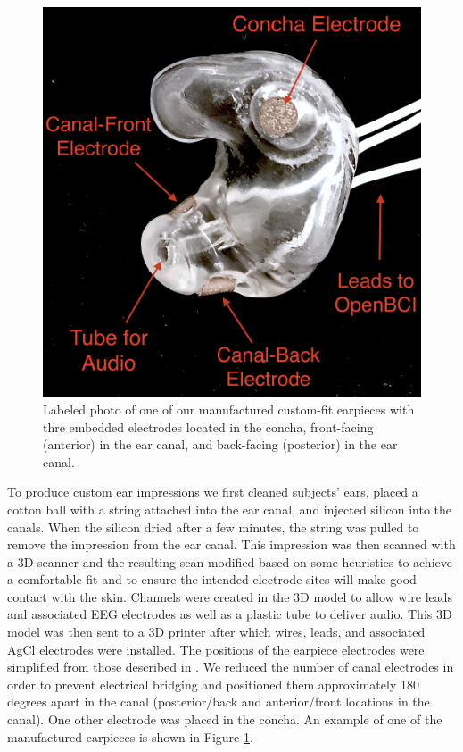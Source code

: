 \documentclass{sigchi}
\begin{document}
\begin{figure}[t]
\centering
\includegraphics[width=.75\linewidth]{./figures/CFEEEG_piecefig_Right.jpg}
\caption{Labeled photo of one of our manufactured custom-fit earpieces with thre embedded electrodes located in the concha, front-facing (anterior) in the ear canal, and back-facing (posterior) in the ear canal.}
\label{fig:earpiece_diagram}
\end{figure}

To produce custom ear impressions we first cleaned subjects' ears, placed a cotton ball with a string attached into the ear canal, and injected silicon into the canals. When the silicon dried after a few minutes, the string was pulled to remove the impression from the ear canal. This impression was then scanned with a 3D scanner and the resulting scan modified based on some heuristics to achieve a comfortable fit and to ensure the intended electrode sites will make good contact with the skin. Channels were created in the 3D model to allow wire leads and associated EEG electrodes as well as a plastic tube to deliver audio. This 3D model was then sent to a 3D printer after which wires, leads, and associated AgCl electrodes were installed. The positions of the earpiece electrodes were simplified from those described in \cite{Mikkelsen2015}. We reduced the number of canal electrodes in order to prevent electrical bridging and positioned them approximately 180 degrees apart in the canal (posterior/back and anterior/front locations in the canal). One other electrode was placed in the concha. An example of one of the manufactured earpieces is shown in Figure \ref{fig:earpiece_diagram}.
\end{document}
